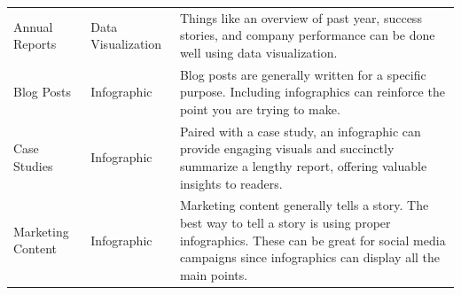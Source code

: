 \documentclass[]{book}
\begin{document}
\begin{longtable}[]{@{}lll@{}}
\begin{minipage}[t]{0.13\columnwidth}\raggedright
Annual Reports\strut
\end{minipage} & \begin{minipage}[t]{0.18\columnwidth}\raggedright
Data Visualization\strut
\end{minipage} & \begin{minipage}[t]{0.60\columnwidth}\raggedright
Things like an overview of past year, success stories, and company performance can be done well using data visualization.\strut
\end{minipage}\tabularnewline
\begin{minipage}[t]{0.13\columnwidth}\raggedright
Blog Posts\strut
\end{minipage} & \begin{minipage}[t]{0.18\columnwidth}\raggedright
Infographic\strut
\end{minipage} & \begin{minipage}[t]{0.60\columnwidth}\raggedright
Blog posts are generally written for a specific purpose. Including infographics can reinforce the point you are trying to make.\strut
\end{minipage}\tabularnewline
\begin{minipage}[t]{0.13\columnwidth}\raggedright
Case Studies\strut
\end{minipage} & \begin{minipage}[t]{0.18\columnwidth}\raggedright
Infographic\strut
\end{minipage} & \begin{minipage}[t]{0.60\columnwidth}\raggedright
Paired with a case study, an infographic can provide engaging visuals and succinctly summarize a lengthy report, offering valuable insights to readers.\strut
\end{minipage}\tabularnewline
\begin{minipage}[t]{0.13\columnwidth}\raggedright
Marketing Content\strut
\end{minipage} & \begin{minipage}[t]{0.18\columnwidth}\raggedright
Infographic\strut
\end{minipage} & \begin{minipage}[t]{0.60\columnwidth}\raggedright
Marketing content generally tells a story. The best way to tell a story is using proper infographics. These can be great for social media campaigns since infographics can display all the main points.\strut
\end{minipage}\tabularnewline
\bottomrule
\end{longtable}
\end{document}

